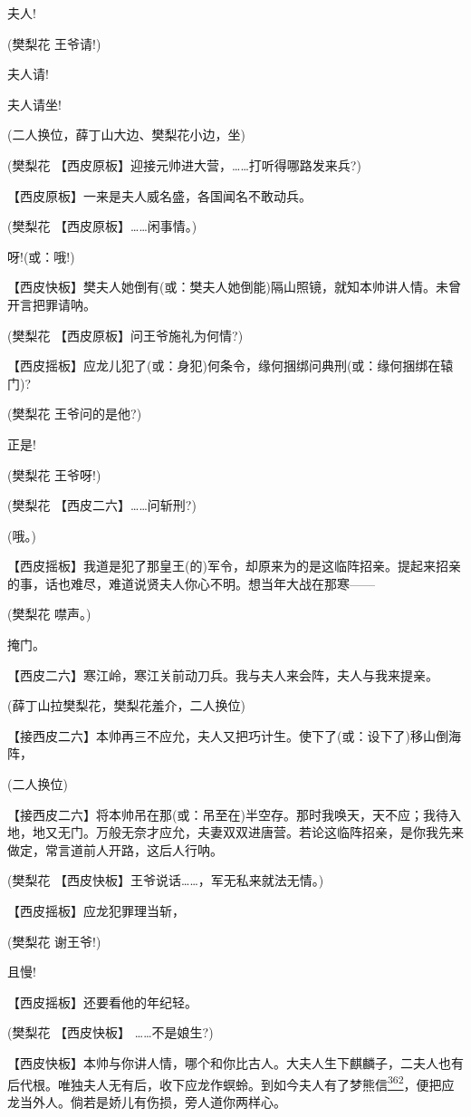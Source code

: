 夫人!

(樊梨花 王爷请!)

夫人请!

夫人请坐!

(二人换位，薛丁山大边、樊梨花小边，坐)

(樊梨花 【西皮原板】迎接元帅进大营，\ldots{}\ldots{}打听得哪路发来兵?)

【西皮原板】一来是夫人威名盛，各国闻名不敢动兵。

(樊梨花 【西皮原板】\ldots{}\ldots{}闲事情。)

呀!(或：哦!)

【西皮快板】樊夫人她倒有(或：樊夫人她倒能)隔山照镜，就知本帅讲人情。未曾开言把罪请呐。

(樊梨花 【西皮原板】问王爷施礼为何情?)

【西皮摇板】应龙儿犯了(或：身犯)何条令，缘何捆绑问典刑(或：缘何捆绑在辕门)?

(樊梨花 王爷问的是他?)

正是!

(樊梨花 王爷呀!)

(樊梨花 【西皮二六】\ldots{}\ldots{}问斩刑?)

(哦。)

【西皮摇板】我道是犯了那皇王(的)军令，却原来为的是这临阵招亲。提起来招亲的事，话也难尽，难道说贤夫人你心不明。想当年大战在那寒------

(樊梨花 噤声。)

掩门。

【西皮二六】寒江岭，寒江关前动刀兵。我与夫人来会阵，夫人与我来提亲。

(薛丁山拉樊梨花，樊梨花羞介，二人换位)

【接西皮二六】本帅再三不应允，夫人又把巧计生。使下了(或：设下了)移山倒海阵，

(二人换位)

【接西皮二六】将本帅吊在那(或：吊至在)半空存。那时我唤天，天不应；我待入地，地又无门。万般无奈才应允，夫妻双双进唐营。若论这临阵招亲，是你我先来做定，常言道前人开路，这后人行呐。

(樊梨花 【西皮快板】王爷说话\ldots{}\ldots{}，军无私来就法无情。)

【西皮摇板】应龙犯罪理当斩，

(樊梨花 谢王爷!)

且慢!

【西皮摇板】还要看他的年纪轻。

(樊梨花 【西皮快板】 \ldots{}\ldots{}不是娘生?)

【西皮快板】本帅与你讲人情，哪个和你比古人。大夫人生下麒麟子，二夫人也有后代根。唯独夫人无有后，收下应龙作螟蛉。到如今夫人有了梦熊信\protect\hyperlink{fn362}{\textsuperscript{362}}，便把应龙当外人。倘若是娇儿有伤损，旁人道你两样心。

